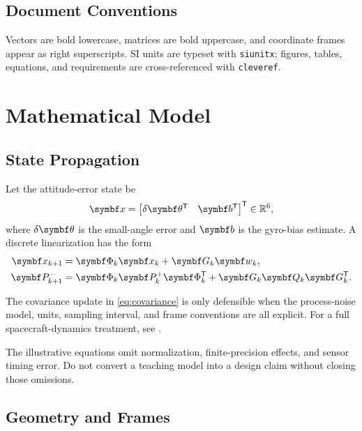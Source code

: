 \documentclass{linearspace-report}
\begin{document}
\section{Document Conventions}

Vectors are bold lowercase, matrices are bold uppercase, and coordinate frames
appear as right superscripts. SI units are typeset with \texttt{siunitx}; figures,
tables, equations, and requirements are cross-referenced with \texttt{cleveref}.

\chapter{Mathematical Model}

\section{State Propagation}

Let the attitude-error state be
\begin{equation}
  \vect{x}
  =
  \begin{bmatrix}
    \delta\vect{\theta}^{\transpose} & \vect{b}^{\transpose}
  \end{bmatrix}^{\transpose}
  \in \Rset^{6},
  \label{eq:state}
\end{equation}
where \(\delta\vect{\theta}\) is the small-angle error and \(\vect{b}\) is
the gyro-bias estimate. A discrete linearization has the form
\begin{align}
  \vect{x}_{k+1} &= \mat{\Phi}_k\vect{x}_k + \mat{G}_k\vect{w}_k, \\
  \mat{P}_{k+1}^{-} &=
    \mat{\Phi}_k\mat{P}_{k}^{+}\mat{\Phi}_k^{\transpose}
    + \mat{G}_k\mat{Q}_k\mat{G}_k^{\transpose}.
  \label{eq:covariance}
\end{align}

The covariance update in \cref{eq:covariance} is only defensible when the
process-noise model, units, sampling interval, and frame conventions are all
explicit. For a full spacecraft-dynamics treatment, see \textcite{schaub2018}.

\begin{LSWarning}
The illustrative equations omit normalization, finite-precision effects, and
sensor timing error. Do not convert a teaching model into a design claim without
closing those omissions.
\end{LSWarning}

\section{Geometry and Frames}
\end{document}
